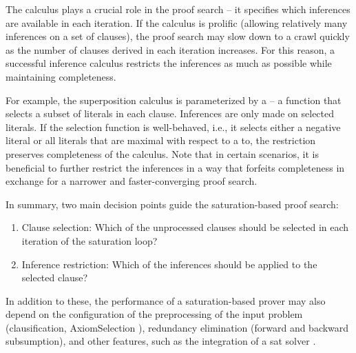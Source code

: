 The calculus plays a crucial role in the proof search -- it specifies which inferences are available in each iteration.
If the calculus is prolific (allowing relatively many inferences on a set of clauses), the proof search may slow down to a crawl quickly as the number of clauses derived in each iteration increases.
For this reason, a successful inference calculus restricts the inferences as much as possible while maintaining completeness.

For example, the superposition calculus \cite{DBLP:journals/logcom/BachmairG94}
is parameterized by a  -- a function that selects a subset of literals in each clause.
Inferences are only made on selected literals.
If the selection function is well-behaved,
i.e., it selects either a negative literal or all literals that are maximal with respect to a \gls{to},
the restriction preserves completeness of the calculus.
Note that in certain scenarios, it is beneficial to further restrict the inferences in a way that forfeits completeness
in exchange for a narrower and faster-converging proof search.



In summary, two main decision points guide the \gls{saturation}-based proof search:
\begin{enumerate}
\item Clause selection: Which of the unprocessed clauses should be selected in each iteration of the saturation loop?
\item Inference restriction: Which of the inferences should be applied to the selected clause?
\end{enumerate}

In addition to these, the performance of a saturation-based prover may also depend on the configuration of the preprocessing of the input problem (clausification, \gls{AxiomSelection} \cite{DBLP:conf/cade/HoderV11,DBLP:conf/cade/KuhlweinLTUH12}), redundancy elimination (forward and backward subsumption), and other features, such as the integration of a \gls{sat} solver \cite{DBLP:conf/cav/Voronkov14}.

